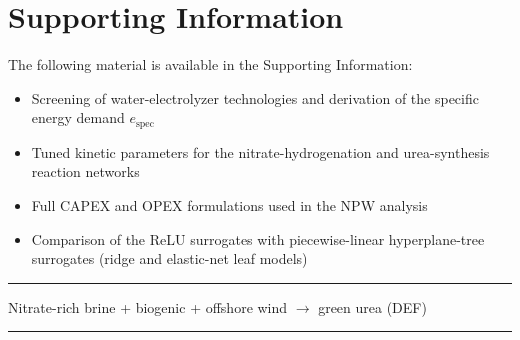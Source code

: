\documentclass[letterpaper]{article}
\begin{document}
\section*{Supporting Information}

The following material is available in the Supporting Information:
\begin{itemize}
  \item Screening of water-electrolyzer technologies and derivation
    of the specific energy demand $e_{\mathrm{spec}}$
  \item Tuned kinetic parameters for the nitrate-hydrogenation and
    urea-synthesis reaction networks
  \item Full CAPEX and OPEX formulations used in the NPW analysis
  \item Comparison of the ReLU surrogates with piecewise-linear
    hyperplane-tree surrogates (ridge and elastic-net leaf models)
\end{itemize}

\printbibliography

\newpage

\rule{0.05in}{1.75in}%
\begin{minipage}[b][1.75in]{3.25in}
  \sffamily
  \frenchspacing
  \centering
  Nitrate-rich brine + biogenic  + offshore wind
  $\rightarrow$ green urea (DEF)
\end{minipage}%
\rule{0.05in}{1.75in}
\end{document}
